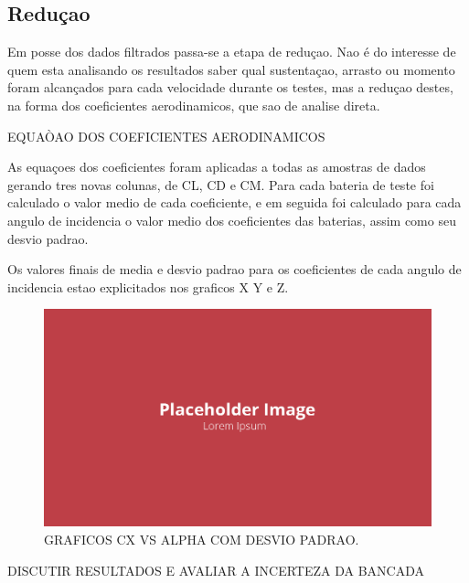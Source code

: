 \subsection{Reduçao}

Em posse dos dados filtrados passa-se a etapa de reduçao. Nao é do interesse de quem esta analisando os resultados saber qual sustentaçao, arrasto ou momento foram alcançados para cada velocidade durante os testes, mas a reduçao destes, na forma dos coeficientes aerodinamicos, que sao de analise direta.

EQUAÒAO DOS COEFICIENTES AERODINAMICOS

As equaçoes dos coeficientes foram aplicadas a todas as amostras de dados gerando tres novas colunas, de CL, CD e CM. Para cada bateria de teste foi calculado o valor medio de cada coeficiente, e em seguida foi calculado para cada angulo de incidencia o valor medio dos coeficientes das baterias, assim como seu desvio padrao.

Os valores finais de media e desvio padrao para os coeficientes de cada angulo de incidencia estao explicitados nos graficos X Y e Z.

\begin{figure}[!ht]
    \centering
    \includegraphics[width=.8\linewidth]{figuras/placeholder.png}
    \caption{GRAFICOS CX VS ALPHA COM DESVIO PADRAO\cite{autor}.}
    \label{fig:placeholder}
\end{figure}

DISCUTIR RESULTADOS E AVALIAR A INCERTEZA DA BANCADA

